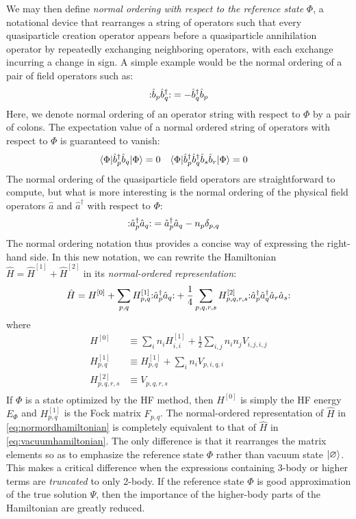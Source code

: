 We may then define \emph{normal ordering with respect to the reference state} $\Phi$, a notational device that rearranges a string of operators such that every quasiparticle creation operator appears before a quasiparticle annihilation operator by repeatedly exchanging neighboring operators, with each exchange incurring a change in sign.  A simple example would be the normal ordering of a pair of field operators such as:
\begin{align*}
  \mathopen: \hat{b}_p \hat{b}_q^\dagger \mathclose: =
  -\hat{b}_q^\dagger \hat{b}_p
\end{align*}
Here, we denote normal ordering of an operator string with respect to $\Phi$ by a pair of colons.  The expectation value of a normal ordered string of operators with respect to $\Phi$ is guaranteed to vanish:
\begin{align*}
&\langle \Phi | \hat{b}_p^\dagger \hat{b}_q | \Phi \rangle = 0 &
&\langle \Phi | \hat{b}_p^\dagger \hat{b}_q^\dagger \hat{b}_s \hat{b}_r | \Phi \rangle = 0
\end{align*}
The normal ordering of the quasiparticle field operators are straightforward to compute, but what is more interesting is the normal ordering of the physical field operators $\hat a$ and $\hat a^\dagger$ with respect to $\Phi$:
\begin{align*}
  \mathopen: \hat{a}_p^\dagger \hat{a}_q \mathclose: &=
  \hat{a}_p^\dagger \hat{a}_q - n_p \delta_{p, q}
\end{align*}
The normal ordering notation thus provides a concise way of expressing the right-hand side.  In this new notation, we can rewrite the Hamiltonian $\hat H = \hat{H}^{[1]} + \hat{H}^{[2]}$ in its \emph{normal-ordered representation}:
\begin{align}
  \hat{H} = H^{[0]} + \sum_{p, q} H^{[1]}_{p, q} \mathopen: \hat{a}_p^\dagger \hat{a}_q \mathclose: + \frac{1}{4} \sum_{p, q, r, s} H^{[2]}_{p, q, r, s} \mathopen: \hat{a}_p^\dagger \hat{a}_q^\dagger \hat{a}_r \hat{a}_s \mathclose:
  \label{eq:normordhamiltonian}
\end{align}
where
\begin{align*}
  H^{[0]} &\equiv \sum_{i} n_i H^{[1]}_{i, i} + \frac{1}{2} \sum_{i, j} n_i n_j V_{i, j, i, j} \\
  H^{[1]}_{p, q} &\equiv H^{[1]}_{p, q} + \sum_{i} n_i V_{p, i, q, i} \\
  H^{[2]}_{p, q, r, s} &\equiv V_{p, q, r, s} \\
\end{align*}
If $\Phi$ is a state optimized by the HF method, then $H^{[0]}$ is simply the HF energy $E_\Phi$ and $H^{[1]}_{p, q}$ is the Fock matrix $F_{p, q}$.  The normal-ordered representation of $\hat H$ in \eqref{eq:normordhamiltonian} is completely equivalent to that of $\hat H$ in \eqref{eq:vacuumhamiltonian}.  The only difference is that it rearranges the matrix elements so as to emphasize the reference state $\Phi$ rather than vacuum state $| \varnothing \rangle$.  This makes a critical difference when the expressions containing 3-body or higher terms are \emph{truncated} to only 2-body.  If the reference state $\Phi$ is good approximation of the true solution $\Psi$, then the importance of the higher-body parts of the Hamiltonian are greatly reduced.

